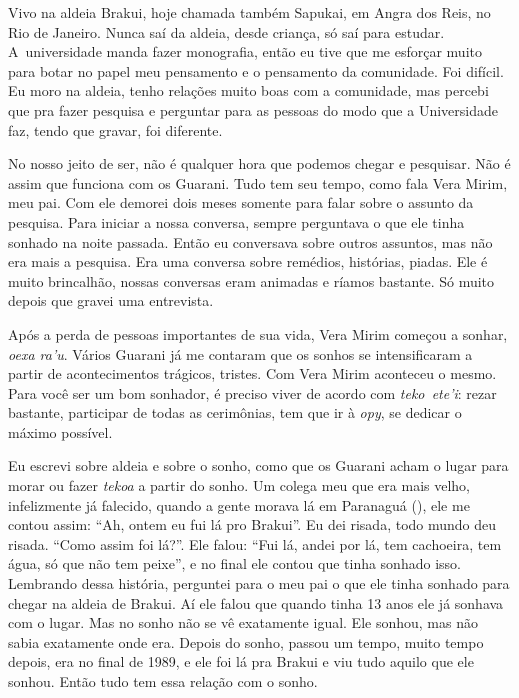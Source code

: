Vivo na aldeia Brakui, hoje chamada também Sapukai, em Angra dos Reis,
no Rio de Janeiro. Nunca saí da aldeia, desde criança, só saí para
estudar. A~universidade manda fazer monografia, então eu tive que me
esforçar muito para botar no papel meu pensamento e o pensamento da
comunidade. Foi difícil. Eu moro na aldeia, tenho relações muito boas
com a comunidade, mas percebi que pra fazer pesquisa e perguntar para
as pessoas do modo que a Universidade faz, tendo que gravar, foi
diferente.

No nosso jeito de ser, não é qualquer hora que podemos chegar e
pesquisar. Não é assim que funciona com os Guarani. Tudo tem seu tempo,
como fala Vera Mirim, meu pai. Com ele demorei dois meses somente para
falar sobre o assunto da pesquisa. Para iniciar a nossa conversa,
sempre perguntava o que ele tinha sonhado na noite passada. Então eu
conversava sobre outros assuntos, mas não era mais a pesquisa. Era uma
conversa sobre remédios, histórias, piadas. Ele é muito brincalhão,
nossas conversas eram animadas e ríamos bastante. Só muito depois que
gravei uma entrevista. 

Após a perda de pessoas importantes de sua vida, Vera Mirim começou a
sonhar, \emph{oexa ra’u}. Vários Guarani já me contaram que os sonhos se
intensificaram a partir de acontecimentos trágicos, tristes. Com Vera
Mirim aconteceu o mesmo. Para você ser um bom sonhador, é preciso viver
de acordo com \emph{teko~ete’i}: rezar bastante, participar de todas as
cerimônias, tem que ir à \emph{opy}, se dedicar o máximo possível.

Eu escrevi sobre aldeia e sobre o sonho, como que os Guarani acham o
lugar para morar ou fazer \emph{tekoa} a partir do sonho. Um colega meu que
era mais velho, infelizmente já falecido, quando a gente morava lá em
Paranaguá (), ele me contou assim: ``Ah, ontem eu fui lá pro Brakui''.
Eu dei risada, todo mundo deu risada. ``Como assim foi lá?''. Ele falou:
``Fui lá, andei por lá, tem cachoeira, tem água, só que não tem peixe'',
e no final ele contou que tinha sonhado isso. Lembrando dessa história,
perguntei para o meu pai o que ele tinha sonhado para chegar na aldeia
de Brakui. Aí ele falou que quando tinha 13 anos ele já sonhava com o
lugar. Mas no sonho não se vê exatamente igual. Ele sonhou, mas não
sabia exatamente onde era. Depois do sonho, passou um tempo, muito
tempo depois, era no final de 1989, e ele foi lá pra Brakui e viu tudo
aquilo que ele sonhou. Então tudo tem essa relação com o sonho.


